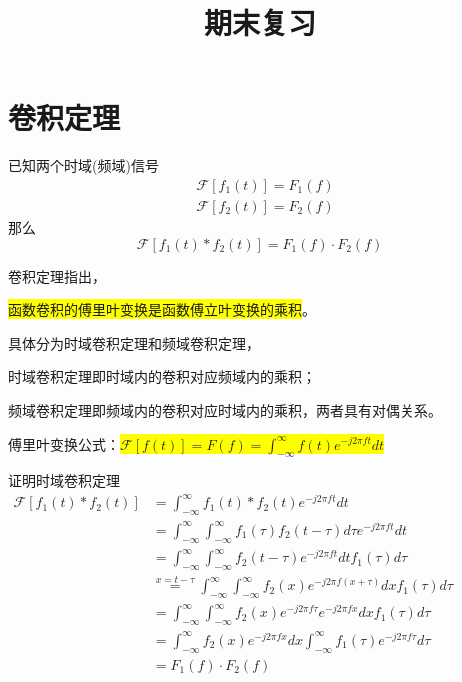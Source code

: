 \documentclass{lzureport}
\title{期末复习}
\date{\zhtoday}
\begin{document}
\makecover

%

\thispagestyle{empty}
\tableofcontents
\newpage 
\setcounter{page}{1}
\setcounter{equation}{0} %

\section{卷积定理}
\begin{Thm}[卷积定理]
	已知两个时域(频域)信号
	$$
	\begin{aligned}
		&\mathscr{F}[f_{1}(t)] =F_{1}(f)  \\
		&\mathscr{F}[f_{2}(t)] =F_2(f)  
	\end{aligned}
	$$
	那么
	$$
	\mathscr{F}\left[f_1(t)*f_2(t)\right]=F_1(f)\cdot F_2(f)
	$$
\end{Thm}	
卷积定理指出，

\colorbox{yellow}{\color{black}\textcolor{YBXPurple}{函数卷积的傅里叶变换}是\textcolor{YBXPurple}{函数傅立叶变换的乘积}}。

具体分为时域卷积定理和频域卷积定理，

\textcolor{YBXPurple}{时域卷积定理}即\textcolor{YBXPurple}{时域}内的卷积对应频域内的乘积；

\textcolor{YBXPurple}{频域卷积定理}即\textcolor{YBXPurple}{频域}内的卷积对应时域内的乘积，两者具有对偶关系。

傅里叶变换公式：\colorbox{yellow}{\color{black}$\mathscr{F}[f(t)]=F(f)=\int_{-\infty}^{\infty}f(t)e^{-j2\pi ft}dt$}

\begin{derivation}{证明时域卷积定理}
	$
	\begin{aligned}
		\mathscr{F}[f_{1}(t)*f_{2}(t)]&=\int_{-\infty}^{\infty}f_{1}(t)*f_{2}(t)e^{-j2\pi ft}dt \\
		&=\int_{-\infty}^{\infty}\int_{-\infty}^{\infty}f_{1}(\tau)f_{2}(t-\tau)d\tau e^{-j2\pi ft}dt \\
		&=\int_{-\infty}^{\infty}\int_{-\infty}^{\infty}f_2(t-\tau)e^{-j2\pi ft}dtf_1(\tau)d\tau  \\
		&\overset{x=t-\tau}{=}\int_{-\infty}^{\infty}\int_{-\infty}^{\infty}f_2(x)e^{-j2\pi f(x+\tau)}dxf_1(\tau)d\tau \\
		&=\int_{-\infty}^{\infty}\int_{-\infty}^{\infty}f_2(x)e^{-j2\pi f\tau}e^{-j2\pi fx}dxf_1(\tau)d\tau  \\
		&=\int_{-\infty}^\infty f_2(x)e^{-j2\pi fx}dx\int_{-\infty}^\infty f_1(\tau)e^{-j2\pi f\tau}d\tau  \\
		&=F_1(f)\cdot F_2(f)
	\end{aligned}$
\end{derivation}
\end{document}
